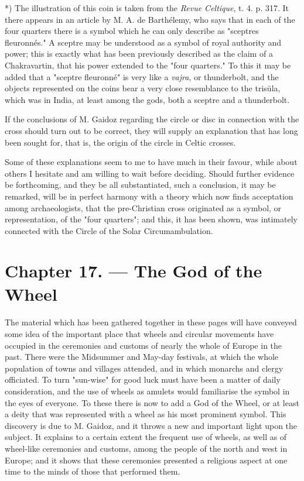 \documentclass[a4paper, 11pt, oneside, polutonikogreek, english]{article}
\begin{document}
*) The illustration of this coin is taken from the \emph{Revue Celtique}, t. 4. p. 317. It there appears in an article by M. A. de Barthélemy, who says that in each of the four quarters there is a symbol which he can only describe as "sceptres fleuronnés." A sceptre may be understood as a symbol of royal authority and power; this is exactly what has been previously described as the claim of a Chakravartin, that his power extended to the "four quarters." To this it may be added that a "sceptre fleuronné" is very like a \emph{vajra}, or thunderbolt, and the objects represented on the coins bear a very close resemblance to the trisūla, which was in India, at least among the gods, both a sceptre and a thunderbolt.

If the conclusions of M. Gaidoz regarding the circle or disc in connection with the cross should turn out to be correct, they will supply an explanation that has long been sought for, that is, the origin of the circle in Celtic crosses.

Some of these explanations seem to me to have much in their favour, while about others I hesitate and am willing to wait before deciding. Should further evidence be forthcoming, and they be all substantiated, such a conclusion, it may be remarked, will be in perfect harmony with a theory which now finds acceptation among archaeologists, that the pre-Christian cross originated as a symbol, or representation, of the "four quarters"; and this, it has been shown, was intimately connected with the Circle of the Solar Circumambulation.
\clearpage
\section{Chapter 17. --- The God of the Wheel}
\paragraph{}
The material which has been gathered together in these pages will have conveyed some idea of the important place that wheels and circular movements have occupied in the ceremonies and customs of nearly the whole of Europe in the past. There were the Midsummer and May-day festivals, at which the whole population of towns and villages attended, and in which monarchs and clergy officiated. To turn "sun-wise" for good luck must have been a matter of daily consideration, and the use of wheels as amulets would familiarise the symbol in the eyes of everyone. To these there is now to add a God of the Wheel, or at least a deity that was represented with a wheel as his most prominent symbol. This discovery is due to M. Gaidoz, and it throws a new and important light upon the subject. It explains to a certain extent the frequent use of wheels, as well as of wheel-like ceremonies and customs, among the people of the north and west in Europe; and it shows that these ceremonies presented a religious aspect at one time to the minds of those that performed them.
\end{document}
